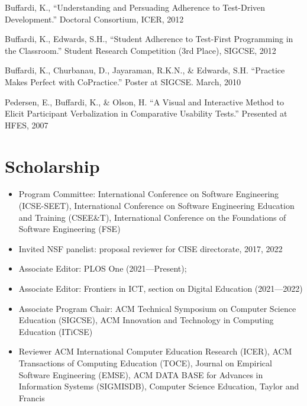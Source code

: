 \documentclass[10pt,letterpaper]{article}
\begin{document}
{\vspace{0.15em}
\noindent\makebox[2.6em][l]{\textbf{[p04]}}\parbox[t]{\dimexpr\linewidth-2.6em\relax}{Buffardi, K., ``Understanding and Persuading Adherence to Test-Driven Development.'' Doctoral Consortium, ICER, 2012}\par
\vspace{0.15em}
\noindent\makebox[2.6em][l]{\textbf{[p03]}}\parbox[t]{\dimexpr\linewidth-2.6em\relax}{Buffardi, K., Edwards, S.H., ``Student Adherence to Test-First Programming in the Classroom.'' Student Research Competition (3rd Place), SIGCSE, 2012}\par
\vspace{0.15em}
\noindent\makebox[2.6em][l]{\textbf{[p02]}}\parbox[t]{\dimexpr\linewidth-2.6em\relax}{Buffardi, K., Churbanau, D., Jayaraman, R.K.N., \& Edwards, S.H. ``Practice Makes Perfect with CoPractice.'' Poster at SIGCSE. March, 2010}\par
\vspace{0.15em}
\noindent\makebox[2.6em][l]{\textbf{[p01]}}\parbox[t]{\dimexpr\linewidth-2.6em\relax}{Pedersen, E., Buffardi, K., \& Olson, H. ``A Visual and Interactive Method to Elicit Participant Verbalization in Comparative Usability Tests.'' Presented at HFES, 2007\par
\vspace{0.15em}
}
\section*{Scholarship}
\begin{itemize}[leftmargin=1.25em]
\item Program Committee: International Conference on Software Engineering (ICSE-SEET), International Conference on Software Engineering Education and Training (CSEE\&T), International Conference on the Foundations of Software Engineering (FSE)
\item Invited NSF panelist: proposal reviewer for CISE directorate, 2017, 2022
\item Associate Editor: PLOS One (2021---Present);
\item Associate Editor: Frontiers in ICT, section on Digital Education (2021---2022)
\item Associate Program Chair: ACM Technical Symposium on Computer Science Education (SIGCSE), ACM Innovation and Technology in Computing Education (ITiCSE)
\item Reviewer ACM International Computer Education Research (ICER), ACM Transactions of Computing Education (TOCE), Journal on Empirical Software Engineering (EMSE), ACM DATA BASE for Advances in Information Systems (SIGMISDB), Computer Science Education, Taylor and Francis

\end{itemize}}
\end{document}
